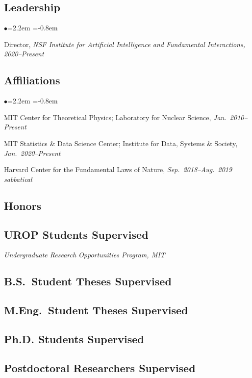 \documentclass[11pt]{article}
\newcommand{\heading}[1]{\vspace{0in}\subsection*{#1} \vspace{.02in}}
\newcommand{\bbl}{\begin{list}{$\bullet$}{\leftmargin=2.2em \itemsep=-1pt \itemindent=-0.8em}}
\newcommand{\el}{\end{list}}
\begin{document}

\newpage

\heading{Leadership}

\bbl
\item Director, \textit{NSF Institute for Artificial Intelligence and Fundamental Interactions, 2020--Present}
\el


\heading{Affiliations}

\bbl
\item MIT Center for Theoretical Physics; Laboratory for Nuclear Science, \textit{Jan.~2010--Present}
\item MIT Statistics \& Data Science Center; Institute for Data, Systems \& Society, \textit{Jan.~2020--Present}
\item Harvard Center for the Fundamental Laws of Nature, \textit{Sep.~2018--Aug.~2019 sabbatical}
\el



\heading{Honors}






\heading{UROP Students Supervised}
\vspace{-.1in}
\textit{Undergraduate Research Opportunities Program, MIT}




\heading{B.S.\ Student Theses Supervised}




\heading{M.Eng.\ Student Theses Supervised}




\heading{Ph.D. Students Supervised}




\heading{Postdoctoral Researchers Supervised}
\end{document}
